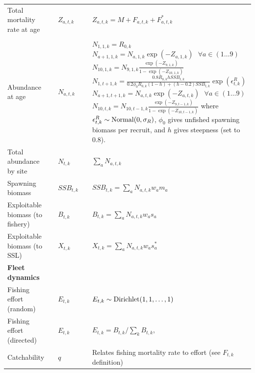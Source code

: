 \documentclass[11pt]{article}
\begin{document}
\begin{longtable}{p{4cm}lll p{8cm}}
Total mortality rate at age & & $Z_{a,t,k}$ & & $Z_{a,t,k}=M+F_{a,t,k}+F_{a,t,k}^*$ \\[2pt]
\\

Abundance at age & & $N_{a,t,k}$ & & $N_{1,1,k} = R_{0,k}$ \newline
$N_{a+1,1,k}=N_{a,1,k}\exp(-Z_{a,1,k})~~~\forall a \in (1\ldots 9)$ \newline
$N_{10,1,k}=N_{9,1,k} \frac{\exp( -Z_{9,1,k})} {1-\exp (-Z_{10,1,k})}$ \newline
$N_{1,t+1,k}=\frac{0.8 R_{0,k} h SSB_{t,k}} {0.2\phi_0 R_{0,k} (1-h)+(h-0.2)SSB_{t,k}}
  \exp(\epsilon_{t,k}^R)$ \newline
$N_{a+1,t+1,k}=N_{a,t,k}\exp(-Z_{a,t,k})~~~\forall a \in (1\ldots 9)$ \newline
$N_{10,t,k}=N_{10,t-1,k} \frac{\exp( -Z_{9,t-1,k})}{1-\exp (-Z_{10,t-1,k})}$ \newline
where $\epsilon_{t,k}^R \sim {\rm Normal}(0,\sigma_R)$, $\phi_0$ gives unfished spawning biomass per recruit, and $h$ gives steepness (set to 0.8).  \\[2pt]

Total abundance by site & & $N_{t,k}$ & & $ \sum_a N_{a,t,k}$ \\

Spawning biomass & & $SSB_{t,k}$ & & $SSB_{t,k}=\sum_a N_{a,t,k} w_a m_a$ \\

Exploitable biomass (to fishery) & & $B_{t,k}$ & & $B_{t,k}= \sum_a N_{a,t,k} w_a s_a$\\

Exploitable biomass (to SSL) & &  $X_{t,k}$ & & $X_{t,k}= \sum_a N_{a,t,k} w_a s_a^*$\\

\midrule

\multicolumn{1}{l}{\textbf{Fleet dynamics}}\\

Fishing effort (random) & & $E_{t,k} $ & & $ E_{t,k} \sim {\rm Dirichlet}(1,1,\hdots,1)$ \\[2pt]

Fishing effort (directed) & & $E_{t,k}$ & & $ E_{t,k} = B_{t,k}/\sum_{k} B_{t,k} $, \newline \\[2pt]

Catchability & & $q$ & & Relates fishing mortality rate to effort (see $F_{t,k}$ definition) \\


\end{longtable}
\end{document}

